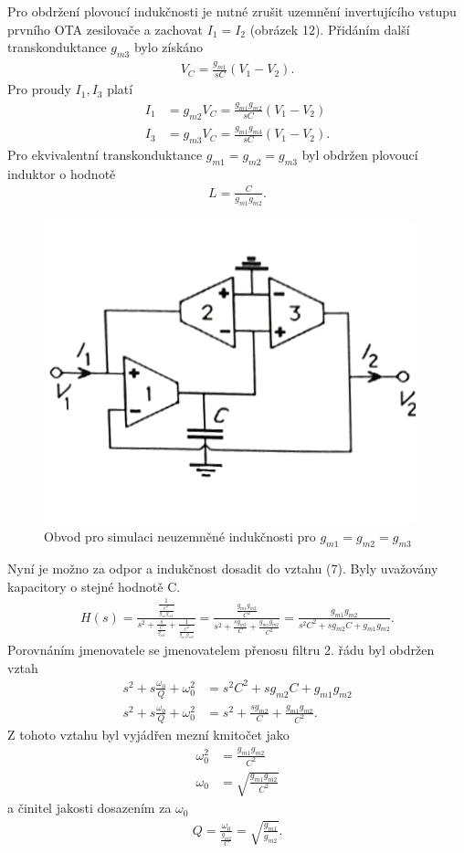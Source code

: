 \documentclass[twoside]{article}
\begin{document}
\noindent Pro obdržení plovoucí indukčnosti je nutné zrušit uzemnění invertujícího vstupu prvního OTA zesilovače a zachovat $I_1 = I_2$ (obrázek 12). Přidáním další transkonduktance $g_{m3}$ bylo získáno
\begin{align}
V_C = \frac{g_{m1}}{sC}(V_1 - V_2).
\end{align}
Pro proudy $I_1, I_3$ platí
\begin{align}
I_1 &= g_{m2}V_C = \frac{g_{m1}g_{m2}}{sC}(V_1 - V_2)\\
I_3 &= g_{m3}V_C = \frac{g_{m1}g_{m3}}{sC}(V_1 - V_2).
\end{align}
Pro ekvivalentní transkonduktance $g_{m1} = g_{m2} = g_{m3}$ byl obdržen plovoucí induktor o hodnotě
\begin{align}
L = \frac{C}{g_{m1}g_{m2}}.
\end{align}
\begin{figure}[H]
\centering
\includegraphics[scale=0.6]{image13.png}
\caption{Obvod pro simulaci neuzemněné indukčnosti pro $g_{m1} = g_{m2} = g_{m3}$\cite{7}}
\end{figure}
\noindent Nyní je možno za odpor a indukčnost dosadit do vztahu (7). Byly uvažovány kapacitory o stejné hodnotě C.
\begin{align}
H(s) = \frac{\frac{1}{\frac{C^2}{g_{m1}g_{m2}}}}{s^2 + \frac{s}{\frac{C}{g_{m2}}} + \frac{1}{\frac{C^2}{g_{m1}g_{m2}}}} = \frac{\frac{g_{m1}g_{m2}}{C^2}}{s^2 + \frac{sg_{m2}}{C} + \frac{g_{m1}g_{m2}}{C^2}} = \frac{g_{m1}g_{m2}}{s^2C^2 + sg_{m2}C + g_{m1}g_{m2}}.
\end{align}
Porovnáním jmenovatele se jmenovatelem přenosu filtru 2. řádu byl obdržen vztah
\begin{align}
s^2 + s\frac{\omega _0}{Q} + \omega _0^2 &= s^2C^2 + sg_{m2}C + g_{m1}g_{m2}\\
s^2 + s\frac{\omega _0}{Q} + \omega _0^2 &= s^2 + \frac{sg_{m2}}{C} + \frac{g_{m1}g_{m2}}{C^2}.
\end{align}
Z tohoto vztahu byl vyjádřen mezní kmitočet jako 
\begin{align}
\omega _0^2 &= \frac{g_{m1}g_{m2}}{C^2} \\
\omega _0 &= \sqrt{\frac{g_{m1}g_{m2}}{C^2}}
\end{align}
a činitel jakosti dosazením za $\omega _0$
\begin{align}
Q = \frac{\omega _0}{\frac{g_{m2}}{C}} = \sqrt{\frac{g_{m1}}{g_{m2}}}.
\end{align}
\end{document}
